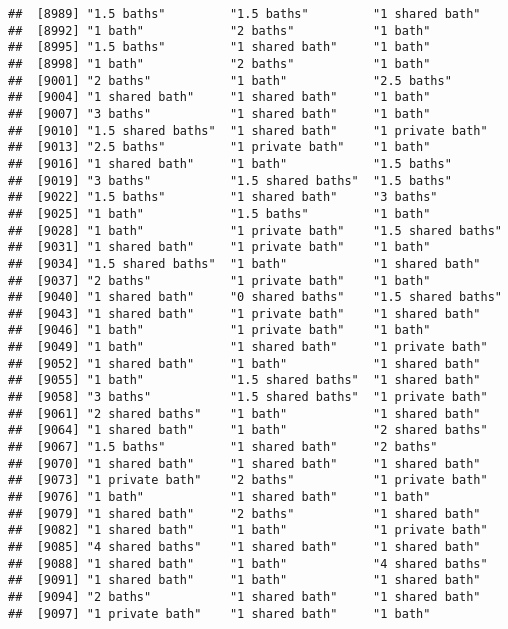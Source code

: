 \documentclass[
]{article}
\begin{document}
\begin{verbatim}
##  [8989] "1.5 baths"         "1.5 baths"         "1 shared bath"    
##  [8992] "1 bath"            "2 baths"           "1 bath"           
##  [8995] "1.5 baths"         "1 shared bath"     "1 bath"           
##  [8998] "1 bath"            "2 baths"           "1 bath"           
##  [9001] "2 baths"           "1 bath"            "2.5 baths"        
##  [9004] "1 shared bath"     "1 shared bath"     "1 bath"           
##  [9007] "3 baths"           "1 shared bath"     "1 bath"           
##  [9010] "1.5 shared baths"  "1 shared bath"     "1 private bath"   
##  [9013] "2.5 baths"         "1 private bath"    "1 bath"           
##  [9016] "1 shared bath"     "1 bath"            "1.5 baths"        
##  [9019] "3 baths"           "1.5 shared baths"  "1.5 baths"        
##  [9022] "1.5 baths"         "1 shared bath"     "3 baths"          
##  [9025] "1 bath"            "1.5 baths"         "1 bath"           
##  [9028] "1 bath"            "1 private bath"    "1.5 shared baths" 
##  [9031] "1 shared bath"     "1 private bath"    "1 bath"           
##  [9034] "1.5 shared baths"  "1 bath"            "1 shared bath"    
##  [9037] "2 baths"           "1 private bath"    "1 bath"           
##  [9040] "1 shared bath"     "0 shared baths"    "1.5 shared baths" 
##  [9043] "1 shared bath"     "1 private bath"    "1 shared bath"    
##  [9046] "1 bath"            "1 private bath"    "1 bath"           
##  [9049] "1 bath"            "1 shared bath"     "1 private bath"   
##  [9052] "1 shared bath"     "1 bath"            "1 shared bath"    
##  [9055] "1 bath"            "1.5 shared baths"  "1 shared bath"    
##  [9058] "3 baths"           "1.5 shared baths"  "1 private bath"   
##  [9061] "2 shared baths"    "1 bath"            "1 shared bath"    
##  [9064] "1 shared bath"     "1 bath"            "2 shared baths"   
##  [9067] "1.5 baths"         "1 shared bath"     "2 baths"          
##  [9070] "1 shared bath"     "1 shared bath"     "1 shared bath"    
##  [9073] "1 private bath"    "2 baths"           "1 private bath"   
##  [9076] "1 bath"            "1 shared bath"     "1 bath"           
##  [9079] "1 shared bath"     "2 baths"           "1 shared bath"    
##  [9082] "1 shared bath"     "1 bath"            "1 private bath"   
##  [9085] "4 shared baths"    "1 shared bath"     "1 shared bath"    
##  [9088] "1 shared bath"     "1 bath"            "4 shared baths"   
##  [9091] "1 shared bath"     "1 bath"            "1 shared bath"    
##  [9094] "2 baths"           "1 shared bath"     "1 shared bath"    
##  [9097] "1 private bath"    "1 shared bath"     "1 bath"           

\end{verbatim}
\end{document}
